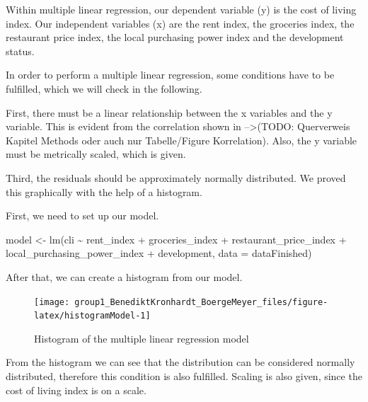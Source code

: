 \documentclass[
  11pt,
  a4paper,
  twoside]{scrbook}
\newenvironment{Shaded}{\begin{snugshade}}{\end{snugshade}}
\newcommand{\AttributeTok}[1]{\textcolor[rgb]{0.77,0.63,0.00}{#1}}
\newcommand{\FunctionTok}[1]{\textcolor[rgb]{0.00,0.00,0.00}{#1}}
\newcommand{\NormalTok}[1]{#1}
\newcommand{\OtherTok}[1]{\textcolor[rgb]{0.56,0.35,0.01}{#1}}
\newcommand{\SpecialCharTok}[1]{\textcolor[rgb]{0.00,0.00,0.00}{#1}}
\begin{document}
Within multiple linear regression, our dependent variable (y) is the cost of living index. Our independent variables (x) are the rent index, the groceries index, the restaurant price index, the local purchasing power index and the development status.

In order to perform a multiple linear regression, some conditions have to be fulfilled, which we will check in the following.

First, there must be a linear relationship between the x variables and the y variable. This is evident from the correlation shown in --\textgreater(TODO: Querverweis Kapitel Methods oder auch nur Tabelle/Figure Korrelation).
Also, the y variable must be metrically scaled, which is given.

Third, the residuals should be approximately normally distributed. We proved this graphically with the help of a histogram.

First, we need to set up our model.

\linespread{1}

\begin{Shaded}
\begin{Highlighting}[]
\NormalTok{model }\OtherTok{\textless{}{-}} \FunctionTok{lm}\NormalTok{(cli }\SpecialCharTok{\textasciitilde{}}\NormalTok{ rent\_index }\SpecialCharTok{+}\NormalTok{ groceries\_index }\SpecialCharTok{+}\NormalTok{ restaurant\_price\_index }\SpecialCharTok{+}\NormalTok{ local\_purchasing\_power\_index }\SpecialCharTok{+}\NormalTok{ development, }\AttributeTok{data =}\NormalTok{ dataFinished)}
\end{Highlighting}
\end{Shaded}

\linespread{1}

After that, we can create a histogram from our model.

\begin{figure}

{\centering \texttt{[image: group1\_BenediktKronhardt\_BoergeMeyer\_files/figure-latex/histogramModel-1]} 

}

\caption{Histogram of the multiple linear regression model}\label{fig:histogramModel}
\end{figure}

From the histogram we can see that the distribution can be considered normally distributed, therefore this condition is also fulfilled.
Scaling is also given, since the cost of living index is on a scale.
\end{document}
